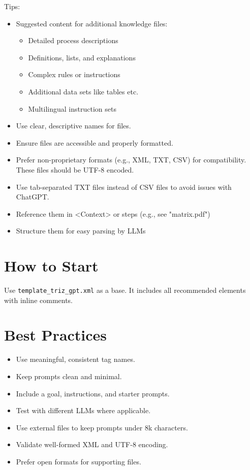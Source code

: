 \documentclass[a4paper,11pt]{refart}
\begin{document}
Tips:
\begin{itemize}
  \item Suggested content for additional knowledge files:
  \begin{itemize}
    \item Detailed process descriptions
    \item Definitions, lists, and explanations
    \item Complex rules or instructions
    \item Additional data sets like tables etc.
    \item Multilingual instruction sets  
  \end{itemize}
  \item Use clear, descriptive names for files.
  \item Ensure files are accessible and properly formatted.
  \item Prefer non-proprietary formats (e.g., XML, TXT, CSV) for compatibility. These files should be UTF-8 encoded.
  \item Use tab-separated TXT files instead of CSV files to avoid issues with ChatGPT.
  \item Reference them in <Context> or steps (e.g., see "matrix.pdf")
  \item Structure them for easy parsing by LLMs
\end{itemize}
  
\section{How to Start}
Use \lstinline!template_triz_gpt.xml! as a base. It includes all recommended elements with inline comments.

\section{Best Practices}
\begin{itemize}
  \item Use meaningful, consistent tag names.
  \item Keep prompts clean and minimal.
  \item Include a goal, instructions, and starter prompts.
  \item Test with different LLMs where applicable.
  \item Use external files to keep prompts under 8k characters.
  \item Validate well-formed XML and UTF-8 encoding.
  \item Prefer open formats for supporting files.
\end{itemize}
\end{document}
